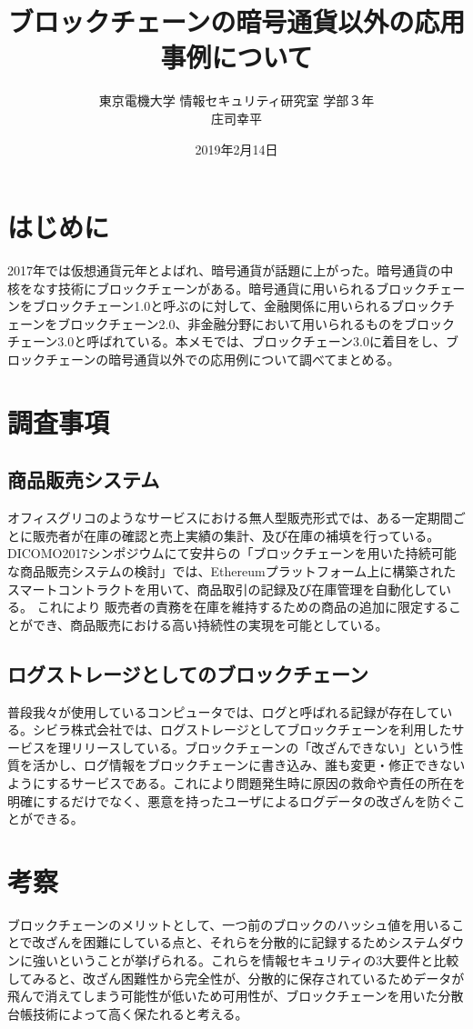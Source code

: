 \documentclass[twocolumn, uplatex]{jarticle}
\title{ブロックチェーンの暗号通貨以外の応用事例について}
\date{2019年2月14日}
\author{東京電機大学 情報セキュリティ研究室 学部３年\\庄司幸平}
\begin{document}
	\maketitle

	\section{はじめに}
	2017年では仮想通貨元年とよばれ、暗号通貨が話題に上がった。暗号通貨の中核をなす技術にブロックチェーンがある。暗号通貨に用いられるブロックチェーンをブロックチェーン1.0と呼ぶのに対して、金融関係に用いられるブロックチェーンをブロックチェーン2.0、非金融分野において用いられるものをブロックチェーン3.0と呼ばれている。本メモでは、ブロックチェーン3.0に着目をし、ブロックチェーンの暗号通貨以外での応用例について調べてまとめる。

	\section{調査事項}

	\subsection{商品販売システム}
	オフィスグリコのようなサービスにおける無人型販売形式では、ある一定期間ごとに販売者が在庫の確認と売上実績の集計、及び在庫の補填を行っている。
	DICOMO2017シンポジウムにて安井らの「ブロックチェーンを用いた持続可能な商品販売システムの検討」では、Ethereumプラットフォーム上に構築されたスマートコントラクトを用いて、商品取引の記録及び在庫管理を自動化している。
	これにより
	販売者の責務を在庫を維持するための商品の追加に限定することができ、商品販売における高い持続性の実現を可能としている。
	
	\subsection{ログストレージとしてのブロックチェーン}
	普段我々が使用しているコンピュータでは、ログと呼ばれる記録が存在している。シビラ株式会社では、ログストレージとしてブロックチェーンを利用したサービスを理リリースしている。ブロックチェーンの「改ざんできない」という性質を活かし、ログ情報をブロックチェーンに書き込み、誰も変更・修正できないようにするサービスである。これにより問題発生時に原因の救命や責任の所在を明確にするだけでなく、悪意を持ったユーザによるログデータの改ざんを防ぐことができる。
	
	\section{考察}
	ブロックチェーンのメリットとして、一つ前のブロックのハッシュ値を用いることで改ざんを困難にしている点と、それらを分散的に記録するためシステムダウンに強いということが挙げられる。これらを情報セキュリティの3大要件と比較してみると、改ざん困難性から完全性が、分散的に保存されているためデータが飛んで消えてしまう可能性が低いため可用性が、ブロックチェーンを用いた分散台帳技術によって高く保たれると考える。
	
\end{document}
